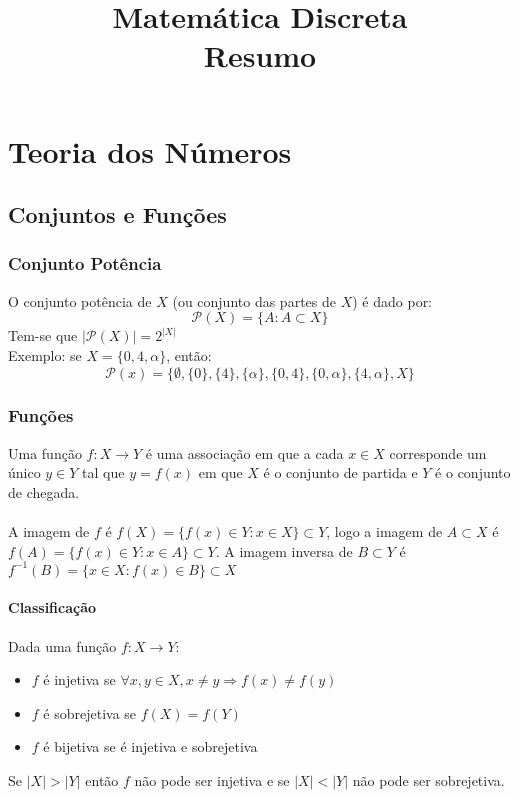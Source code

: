 \documentclass[10pt,a4paper]{report}
\title{\LARGE{Matemática Discreta} \\ \vspace{0.5cm} \normalsize{Resumo}}
\date{}
\begin{document}
\maketitle
\tableofcontents

\chapter{Teoria dos Números}
\section{Conjuntos e Funções}
\subsection{Conjunto Potência}
O conjunto potência de $X$ (ou conjunto das partes de $X$) é dado por:
$$
\mathcal{P}(X) = \{A:A\subset X\}
$$
Tem-se que $|\mathcal{P}(X)| = 2^{|X|}$\\
Exemplo: se $X = \{0,4,\alpha\}$, então:
$$
\mathcal{P}(x) = \{\emptyset,\{0\}, \{4\}, \{\alpha\}, \{0,4\}, \{0,\alpha\}, \{4,\alpha\}, X\}
$$
\subsection{Funções}
Uma função $f: X \rightarrow Y$ é uma associação em que a cada $x \in X$ corresponde um único $y \in Y$ tal que $y = f(x)$ em que $X$ é o conjunto de partida e $Y$ é o conjunto de chegada.\\
\\
A imagem de $f$ é $f(X) = \{f(x)\in Y:x\in X\}\subset Y$, logo a imagem de $A \subset X$ é $f(A) = \{f(x)\in Y:x\in A\}\subset Y$. A imagem inversa de $B \subset Y$ é $f^{-1}(B) = \{x\in X:f(x)\in B\}\subset X$
\subsubsection{Classificação}
Dada uma função $f: X\rightarrow Y$:
\begin{itemize}
\item $f$ é injetiva se $\forall x, y \in X, x \neq y \Rightarrow f(x)\neq f(y)$
\item $f$ é sobrejetiva se $f(X) = f(Y)$
\item $f$ é bijetiva se é injetiva e sobrejetiva
\end{itemize}
Se $|X| > |Y|$ então $f$ não pode ser injetiva e se $|X| < |Y|$ não pode ser sobrejetiva.
\end{document}
